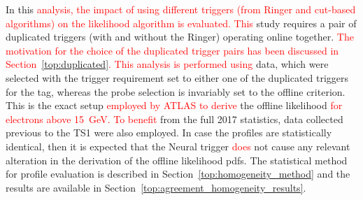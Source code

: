 In this 
\textcolor{red}{analysis, the impact of using different triggers (from Ringer and cut-based algorithms) on the likelihood algorithm is evaluated. This }
study requires a pair of duplicated triggers (with and without the Ringer) operating online together. 
\textcolor{red}{The motivation for the choice of the duplicated trigger pairs has been discussed in Section~\ref{top:duplicated}. This analysis is performed using} 
\Zee{} \tnp{} data, which were selected with the trigger requirement set to either one of the duplicated triggers for the tag, whereas the probe selection is invariably set to the offline \vloose{} criterion. This is the exact setup \textcolor{red}{employed by ATLAS to derive} the offline likelihood \textcolor{red}{for electrons above \SI{15}{\GeV}. To benefit} from the full 2017 statistics, data collected previous to the TS1 were also employed. In case the profiles are statistically identical, then it is expected that the Neural\rnn{} trigger \textcolor{red}{does} not cause any relevant alteration in the derivation of the offline likelihood pdfs.  The statistical method for profile evaluation is described in Section~\ref{top:homogeneity_method} and the results are available in Section~\ref{top:agreement_homogeneity_results}.


